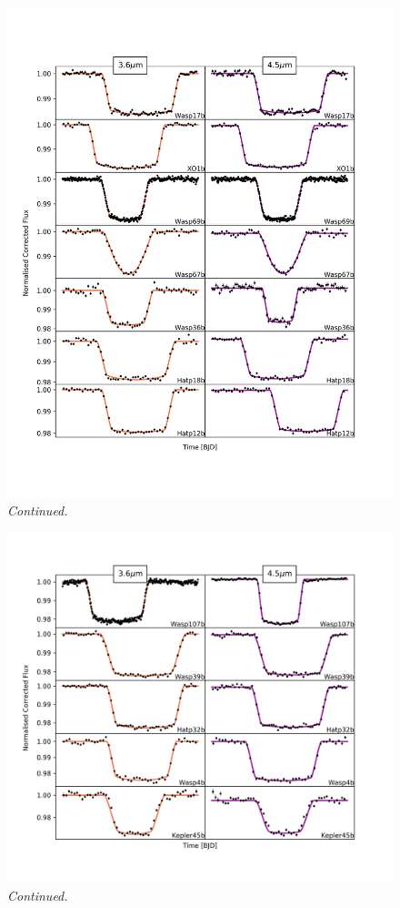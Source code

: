 \begin{subappendices}
  \addtocounter{figure}{-1}
  \begin{figure}
    \includegraphics[trim={0 1cm 0 0},clip,width=\textwidth]{CorrectedLighctuves3.pdf}
    \caption{\textit{Continued.}}
    \label{P1:fig:normlc3}
  \end{figure}

  \addtocounter{figure}{-1}
  \begin{figure}
    \includegraphics[trim={0 1cm 0 0},clip,width=\textwidth]{CorrectedLighctuves4.pdf}
    \caption{\textit{Continued.}}
    \label{P1:fig:normlc4}
    \end{figure}




\end{subappendices}
